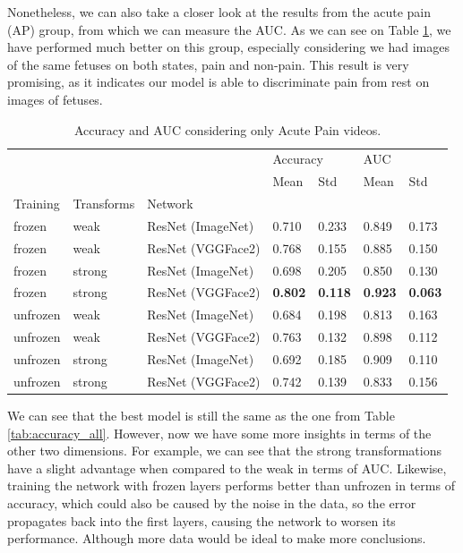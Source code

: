 Nonetheless, we can also take a closer look at the results from the acute pain (AP) group, from which we can measure the AUC. As we can see on Table \ref{tab:accuracy_auc_ap}, we have performed much better on this group, especially considering we had images of the same fetuses on both states, pain and non-pain. This result is very promising, as it indicates our model is able to discriminate pain from rest on images of fetuses.

\begin{table}[h!tp]
\centering
\caption{Accuracy and AUC considering only Acute Pain videos.}
\label{tab:accuracy_auc_ap} 
\begin{tabular}{lllllll}
\toprule
         &        &          & \multicolumn{2}{l}{Accuracy} & \multicolumn{2}{l}{AUC} \\
         &        &          &      Mean &       Std &      Mean &       Std \\
Training & Transforms & Network &           &           &           &           \\
\midrule
frozen   & weak   & ResNet (ImageNet) &  0.710 &  0.233 &  0.849 &  0.173 \\
frozen   & weak   & ResNet (VGGFace2) &  0.768 &  0.155 &  0.885 &  0.150 \\
frozen   & strong & ResNet (ImageNet) &  0.698 &  0.205 &  0.850 &  0.130 \\
frozen   & strong & ResNet (VGGFace2) &  \textbf{0.802} & \textbf{ 0.118} &  \textbf{0.923} &  \textbf{0.063} \\
unfrozen & weak   & ResNet (ImageNet) &  0.684 &  0.198 &  0.813 &  0.163 \\
unfrozen & weak   & ResNet (VGGFace2) &  0.763 &  0.132 &  0.898 &  0.112 \\
unfrozen & strong & ResNet (ImageNet) &  0.692 &  0.185 &  0.909 &  0.110 \\
unfrozen & strong & ResNet (VGGFace2) &  0.742 &  0.139 &  0.833 &  0.156 \\
\bottomrule
\end{tabular}
\end{table}

We can see that the best model is still the same as the one from Table \ref{tab:accuracy_all}. However, now we have some more insights in terms of the other two dimensions. For example, we can see that the strong transformations have a slight advantage when compared to the weak in terms of AUC. Likewise, training the network with frozen layers performs better than unfrozen in terms of accuracy, which could also be caused by the noise in the data, so the error propagates back into the first layers, causing the network to worsen its performance. Although more data would be ideal to make more conclusions.

